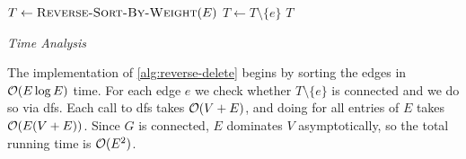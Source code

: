 \documentclass{article}
\begin{document}
\begin{enumerate}[leftmargin={*}, font={\bf}, label={\arabic*.}, ref={\arabic*}]
    \begin{minipage}{\linewidth}
      \begin{algorithm}[H]
        \caption{$\textsc{Minimum-Spanning-Tree}(G \gets (V, E))$}\label{alg:reverse-delete}
        \begin{algorithmic}[1]
          \State $T \gets \Call{Reverse-Sort-By-Weight}{E}$
              \State $T \gets T \setminus \{e\}$
            \EndIf
          \EndFor
          \State \Return $T$
        \end{algorithmic}
      \end{algorithm}
    \end{minipage}
    
    \bigskip

    {\itshape Time Analysis}

    The implementation of \autoref{alg:reverse-delete} begins by sorting the edges in $\operatorname*{\mathcal{O}}(E \log E)$
    time. For each edge $e$ we check whether $T \setminus \{e\}$ is connected and we do so via {\sc
    dfs}. Each call to {\sc dfs} takes $\operatorname*{\mathcal{O}}(V+E)$, and doing for all entries of $E$ takes $\operatorname*{\mathcal{O}}(E(V+E))$.
    Since $G$ is connected, $E$ dominates $V$ asymptotically, so the total running time is $\operatorname*{\mathcal{O}}(E^2)$.
\end{enumerate}
\end{document}
